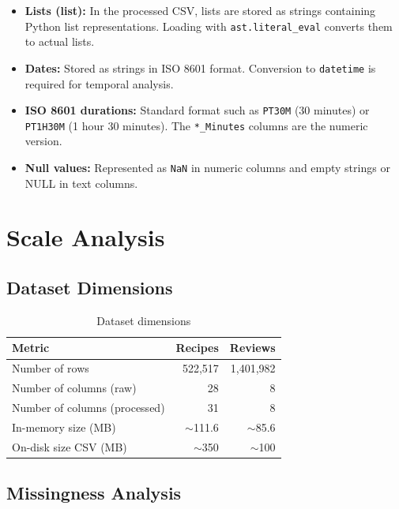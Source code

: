 \documentclass[11pt,a4paper]{article}
\begin{document}
\begin{itemize}
    \item \textbf{Lists (list):} In the processed CSV, lists are stored as strings containing Python list representations. Loading with \texttt{ast.literal\_eval} converts them to actual lists.

    \item \textbf{Dates:} Stored as strings in ISO 8601 format. Conversion to \texttt{datetime} is required for temporal analysis.

    \item \textbf{ISO 8601 durations:} Standard format such as \texttt{PT30M} (30 minutes) or \texttt{PT1H30M} (1 hour 30 minutes). The \texttt{*\_Minutes} columns are the numeric version.

    \item \textbf{Null values:} Represented as \texttt{NaN} in numeric columns and empty strings or NULL in text columns.
\end{itemize}

\section{Scale Analysis}

\subsection{Dataset Dimensions}

\begin{table}[H]
\centering
\begin{tabular}{lrr}
\toprule
\textbf{Metric} & \textbf{Recipes} & \textbf{Reviews} \\
\midrule
Number of rows & 522,517 & 1,401,982 \\
Number of columns (raw) & 28 & 8 \\
Number of columns (processed) & 31 & 8 \\
In-memory size (MB) & $\sim$111.6 & $\sim$85.6 \\
On-disk size CSV (MB) & $\sim$350 & $\sim$100 \\
\bottomrule
\end{tabular}
\caption{Dataset dimensions}
\label{tab:dimensions}
\end{table}

\subsection{Missingness Analysis}
\end{document}
